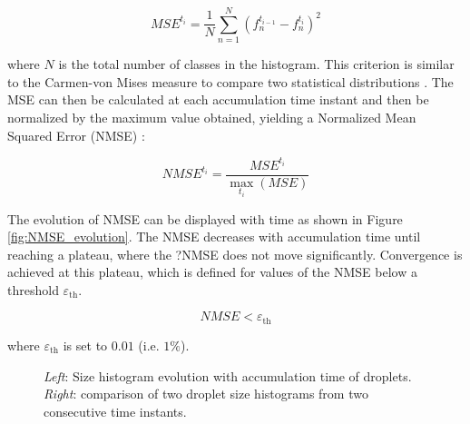 \begin{equation}
MSE^{t_i} = \frac{1}{N} \sum_{n=1}^N \left( f_n^{t_{i-1}} - f_n^{t_i}  \right)^2
\end{equation}

where $N$ is the total number of classes in the histogram. This criterion is similar to the Carmen-von Mises measure to compare two statistical distributions . The MSE can then be calculated at each accumulation time instant and then be normalized by the maximum value obtained, yielding a Normalized Mean Squared Error (NMSE) :

\begin{equation}
NMSE^{t_i} = \frac{MSE^{t_i}}{\max_{t_i} \left( MSE \right)}
\end{equation}

The evolution of NMSE can be displayed with time as shown in Figure \ref{fig:NMSE_evolution}. The NMSE decreases with accumulation time until reaching a plateau, where the ?NMSE does not move significantly. Convergence is achieved at this plateau, which is defined for values of the NMSE below a threshold $\varepsilon_\mathrm{th}$.

\begin{equation}
NMSE < \varepsilon_\mathrm{th}
\end{equation}

where $\varepsilon_\mathrm{th}$ is set to $0.01$ (i.e. $1 \%$).


\begin{figure}[ht]
     \centering
     \begin{subfigure}[b]{0.45\textwidth}
         \centering
     \end{subfigure}
     \begin{subfigure}[b]{0.45\textwidth}
         \centering
     \end{subfigure}
        \caption{\textsl{Left}: Size histogram evolution with accumulation time of droplets. \textsl{Right}: comparison of two droplet size histograms from two consecutive time instants.}
        \label{fig:spray_convergence_description_accumulation_and_MSE_comparison}
\end{figure}



